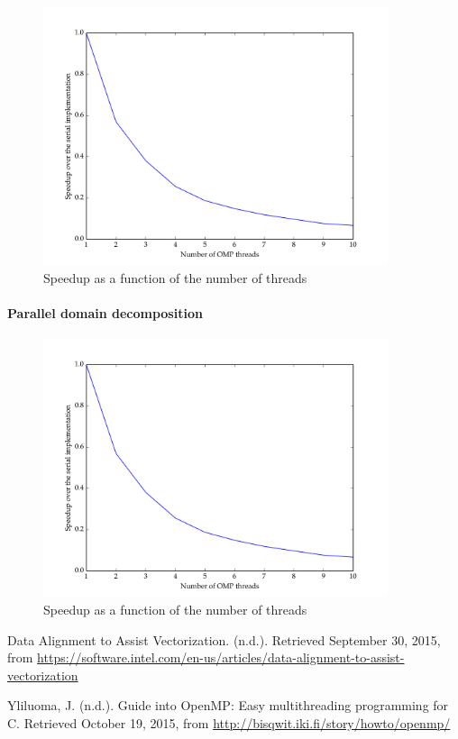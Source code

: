 \documentclass[11pt]{article}
\begin{document}
 \begin{figure}[H]
    \includegraphics[width=0.9\textwidth]{./weak_scaling/weak_scaling_vector_parallel.png}
    \caption{Speedup as a function of the number of threads}
    \label{fig:weak_scaling}
\end{figure} 

\paragraph{Parallel domain decomposition}

 \begin{figure}[H]
    \includegraphics[width=0.9\textwidth]{./weak_scaling/weak_scaling.png}
    \caption{Speedup as a function of the number of threads}
    \label{fig:weak_scaling_dd}
\end{figure} 

\begin{thebibliography}{9}
Data Alignment to Assist Vectorization. (n.d.). Retrieved September 30, 2015, from \url{https://software.intel.com/en-us/articles/data-alignment-to-assist-vectorization}

Yliluoma, J. (n.d.). Guide into OpenMP: Easy multithreading programming for C. Retrieved October 19, 2015, from \url{http://bisqwit.iki.fi/story/howto/openmp/}

\end{thebibliography}

 
 
\end{document}
